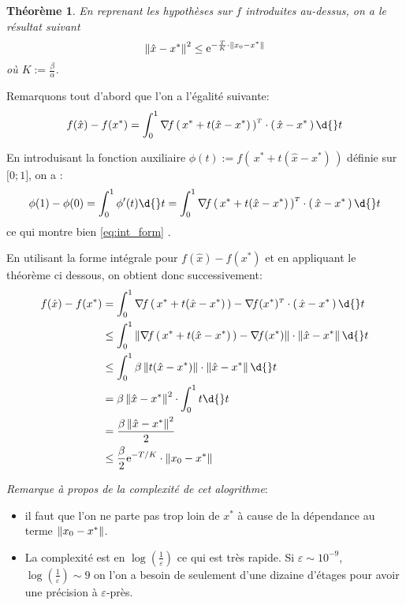 \documentclass[11pt]{article}
\newcommand{\transpose}[1]{\ensuremath{#1^{\scriptscriptstyle T}}}
\newcommand{\dotpourvariable}{\:\cdot\:}
\newcommand{\ifempty}[3]{\ifx\hfuzz#1\hfuzz #2 \else #3\fi}
\newcommand{\norme}[1]{\left\lVert\ifempty{#1}{\dotpourvariable}{#1}\right\rVert}
\newcommand{\prt}[1]{\left( \, #1  \, \right)}
\newcommand*{\e}{\ensuremath{\mathrm{e}}}
\def\dt{\d{}t}
\newcommand{\intervalle}[4]{\mathopen{#1}#2\mathpunct{};#3\mathclose{#4}}
\newcommand{\intff}[2]{\intervalle{[}{#1}{#2}{]}}
\newtheorem{theorem}{Théorème}[section]
\begin{document}
   \begin{theorem}
En reprenant les hypothèses sur $f$ introduites au-dessus, on a le résultat suivant
\begin{equation}
\norme{\hat{x} - x^{*}}^2 \leq \e^{-\frac{T}{K} \cdot \norme{x_0-x^{*}}}
\end{equation}
où $K := \frac{\beta}{\alpha}$.
   \end{theorem}

Remarquons tout d'abord que l'on a l'égalité suivante:
\begin{equation}
  f(\hat{x})- f(x^{*}) = \int_{0}^{1} \transpose{\nabla\! f\prt{x^{*}+t(\hat{x}-x^{*})}}
   \cdot \prt{\hat{x}- x^{*}} \dt
\end{equation}

En introduisant la fonction auxiliaire $\phi(t):= f\prt{x^{*}+t(\hat{x}-x^{*})}$ définie sur $\intff{0}{1}$, on a :
\begin{equation*}\label{eq:int_form}
  \phi(1)-\phi(0)= \int_0^1 \phi^{\prime}(t) \dt = \int_{0}^{1} \transpose{\nabla\! f\prt{x^{*}+t(\hat{x}-x^{*})}}
   \cdot \prt{\hat{x}- x^{*}} \dt
\end{equation*}
ce qui montre bien \eqref{eq:int_form} .

En utilisant la forme intégrale pour $f(\hat{x})- f(x^{*})$ et en appliquant le théorème
ci dessous, on obtient donc successivement:
\begin{align*}
f(\hat{x})- f(x^{*}) &= \int_{0}^{1} \transpose{\nabla\! f\prt{x^{*}+t(\hat{x}-x^{*})}
- \nabla\! f(x^{*})}
 \cdot \prt{\hat{x}- x^{*}} \dt\\
 &\leq \int_{0}^{1} \norme{\nabla\! f\prt{x^{*}+t(\hat{x}-x^{*})} - \nabla\! f(x^{*})}
  \cdot \norme{\hat{x}- x^{*}} \dt\\
 &\leq \int_{0}^{1} \beta \norme{t(\hat{x}-x^{*})}
  \cdot \norme{\hat{x}- x^{*}} \dt\\
 &= \beta \norme{\hat{x}- x^{*}}^2 \cdot \int_{0}^{1} t  \dt\\
 &= \frac{ \beta \norme{\hat{x}- x^{*}}^2}{2} \\
 &\leq \frac{\beta}{2} \e^{-T/K} \cdot \norme{x_0-x^{*}}
\end{align*}

\textit{Remarque à propos de la complexité de cet alogrithme}:
\begin{itemize}
  \item il faut que l'on ne parte pas trop loin de $x^{*}$ à cause de la dépendance au terme $\norme{x_0-x^{*}}$.
  \item La complexité est en $\log(\frac{1}{\varepsilon})$ ce qui est très rapide. Si $\varepsilon \sim 10^{-9}$, $\log(\frac{1}{\varepsilon}) \sim 9$ on l'on a besoin de seulement
  d'une dizaine d'étages pour avoir une précision à $\varepsilon$-près.

\end{itemize}
\end{document}
